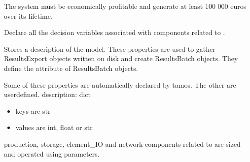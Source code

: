 \documentclass[letterpaper,10pt,english]{sphinxmanual}
\begin{document}
\begin{fulllineitems}
\begin{fulllineitems}
\sphinxAtStartPar
The system must be economically profitable and generate at least 100 000 euros over its lifetime.

\end{fulllineitems}


\begin{fulllineitems}
\label{\detokenize{generated/tamos.MILPModel:tamos.MILPModel.declare_variables}}
\pysigstartsignatures
{}
\pysigstopsignatures
\sphinxAtStartPar
Declare all the decision variables associated with components related to .

\end{fulllineitems}


\begin{fulllineitems}
\label{\detokenize{generated/tamos.MILPModel:tamos.MILPModel.description}}
\pysigstartsignatures
{}
\pysigstopsignatures
\sphinxAtStartPar
Stores a description of the model.
These properties are used to gather ResultsExport objects written on disk and create ResultsBatch objects.
They define the  attribute of ResultsBatch objects.

\sphinxAtStartPar
Some of these properties are automatically declared by tamos. The other are user\sphinxhyphen{}defined.
description: dict
\begin{itemize}
\item {} 
\sphinxAtStartPar
keys are str

\item {} 
\sphinxAtStartPar
values are int, float or str

\end{itemize}

\end{fulllineitems}


\begin{fulllineitems}
\label{\detokenize{generated/tamos.MILPModel:tamos.MILPModel.hubs}}
\pysigstartsignatures
{}
\pysigstopsignatures
\sphinxAtStartPar
production, storage, element\_IO and network components related to 
are sized and operated using  parameters.


\end{fulllineitems}
\end{fulllineitems}
\end{document}

